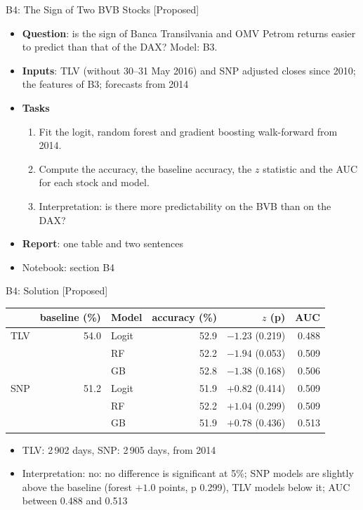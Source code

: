 \begin{frame}{B4: The Sign of Two BVB Stocks [Proposed]}
\itemsize{\footnotesize}
\begin{itemize}
\item \textbf{Question}: is the sign of Banca Transilvania and OMV Petrom returns easier to predict than that of the DAX? Model: B3.
\item \textbf{Inputs}: TLV (without 30--31 May 2016) and SNP adjusted closes since 2010; the features of B3; forecasts from 2014
\item \textbf{Tasks}
\begin{enumerate}
    \item Fit the logit, random forest and gradient boosting walk-forward from 2014.
    \item Compute the accuracy, the baseline accuracy, the $z$ statistic and the AUC for each stock and model.
    \item Interpretation: is there more predictability on the BVB than on the DAX?
\end{enumerate}
\item \textbf{Report}: one table and two sentences
\item Notebook: section B4
\end{itemize}
\end{frame}

\ifsolutions
\begin{frame}{B4: Solution [Proposed]}
\itemsize{\footnotesize}
\begin{center}
\footnotesize
\begin{tabular}{lrlrrr}
\toprule
& baseline (\%) & Model & accuracy (\%) & $z$ (p) & AUC \\
\midrule
TLV & 54.0 & Logit & 52.9 & ${-1.23}$ (0.219) & 0.488 \\
 &  & RF & 52.2 & ${-1.94}$ (0.053) & 0.509 \\
 &  & GB & 52.8 & ${-1.38}$ (0.168) & 0.506 \\
\midrule
SNP & 51.2 & Logit & 51.9 & ${+0.82}$ (0.414) & 0.509 \\
 &  & RF & 52.2 & ${+1.04}$ (0.299) & 0.509 \\
 &  & GB & 51.9 & ${+0.78}$ (0.436) & 0.513 \\
\bottomrule
\end{tabular}
\end{center}
\begin{itemize}
    \item TLV: 2\,902 days, SNP: 2\,905 days, from 2014
    \item Interpretation: no: no difference is significant at 5\%; SNP models are slightly above the baseline (forest $+1.0$ points, p 0.299), TLV models below it; AUC between 0.488 and 0.513
\end{itemize}
\end{frame}
\fi

